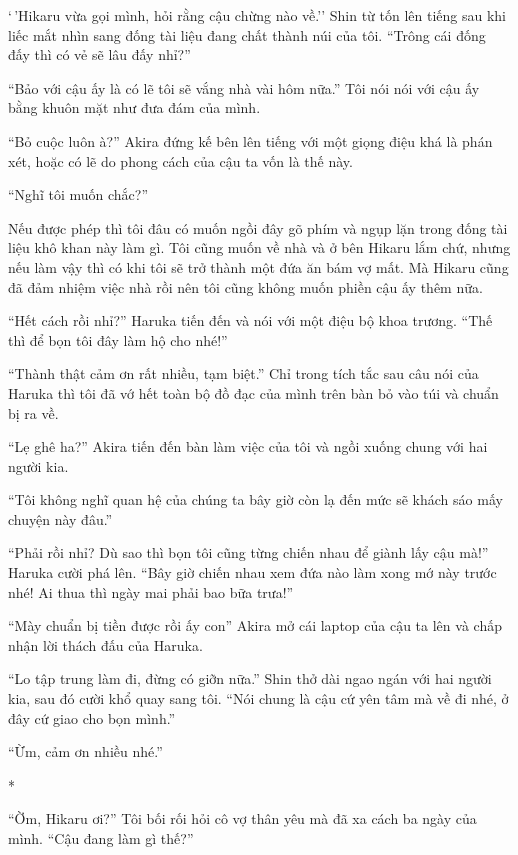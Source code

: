 {    `\,'Hikaru vừa gọi mình, hỏi rằng cậu chừng nào về.'' Shin từ tốn lên
    tiếng sau khi liếc mắt nhìn sang đống tài liệu đang chất thành núi của
    tôi. ``Trông cái đống đấy thì có vẻ sẽ lâu đấy nhỉ?''

    ``Bảo với cậu ấy là có lẽ tôi sẽ vắng nhà vài hôm nữa.'' Tôi nói nói với
    cậu ấy bằng khuôn mặt như đưa đám của mình.

    ``Bỏ cuộc luôn à?'' Akira đứng kế bên lên tiếng với một giọng điệu khá
    là phán xét, hoặc có lẽ do phong cách của cậu ta vốn là thế này.

    ``Nghĩ tôi muốn chắc?''

    Nếu được phép thì tôi đâu có muốn ngồi đây gõ phím và ngụp lặn trong
    đống tài liệu khô khan này làm gì. Tôi cũng muốn về nhà và ở bên Hikaru
    lắm chứ, nhưng nếu làm vậy thì có khi tôi sẽ trở thành một đứa ăn bám vợ
    mất. Mà Hikaru cũng đã đảm nhiệm việc nhà rồi nên tôi cũng không muốn
    phiền cậu ấy thêm nữa.

    ``Hết cách rồi nhỉ?'' Haruka tiến đến và nói với một điệu bộ khoa
    trương. ``Thế thì để bọn tôi đây làm hộ cho nhé!''

    ``Thành thật cảm ơn rất nhiều, tạm biệt.'' Chỉ trong tích tắc sau câu
    nói của Haruka thì tôi đã vớ hết toàn bộ đồ đạc của mình trên bàn bỏ vào
    túi và chuẩn bị ra về.

    ``Lẹ ghê ha?'' Akira tiến đến bàn làm việc của tôi và ngồi xuống chung
    với hai người kia.

    ``Tôi không nghĩ quan hệ của chúng ta bây giờ còn lạ đến mức sẽ khách
    sáo mấy chuyện này đâu.''

    ``Phải rồi nhỉ? Dù sao thì bọn tôi cũng từng chiến nhau để giành lấy cậu
    mà!'' Haruka cười phá lên. ``Bây giờ chiến nhau xem đứa nào làm xong mớ
    này trước nhé! Ai thua thì ngày mai phải bao bữa trưa!''

    ``Mày chuẩn bị tiền được rồi ấy con'' Akira mở cái laptop của cậu ta lên
    và chấp nhận lời thách đấu của Haruka.

    ``Lo tập trung làm đi, đừng có giỡn nữa.'' Shin thở dài ngao ngán với
    hai người kia, sau đó cười khổ quay sang tôi. ``Nói chung là cậu cứ yên
    tâm mà về đi nhé, ở đây cứ giao cho bọn mình.''

    ``Ừm, cảm ơn nhiều nhé.''

    *

    ``Ờm, Hikaru ơi?'' Tôi bối rối hỏi cô vợ thân yêu mà đã xa cách ba ngày
    của mình. ``Cậu đang làm gì thế?''

}
